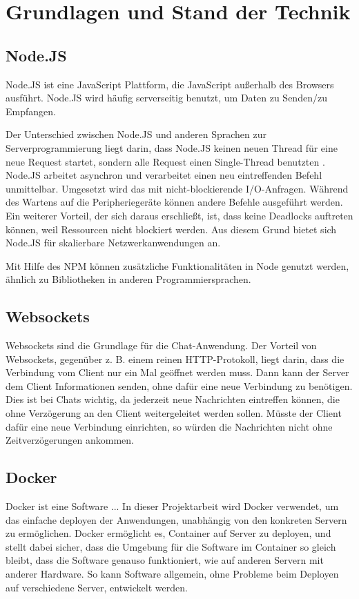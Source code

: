 
\chapter{Grundlagen und Stand der Technik}\label{cha:Grundlagen}
\section{Node.JS}\label{sec:Node.JS}
Node.JS ist eine JavaScript Plattform, die JavaScript außerhalb des Browsers ausführt. Node.JS wird häufig serverseitig benutzt, um Daten zu Senden/zu Empfangen. \cite[vgl.]{Node.2019}

Der Unterschied zwischen Node.JS und anderen Sprachen zur Serverprogrammierung liegt darin, dass Node.JS keinen neuen Thread für eine neue Request startet, sondern alle Request einen Single-Thread benutzten \cite[vgl.][3]{Holmes.2013}. Node.JS arbeitet asynchron und verarbeitet einen neu eintreffenden Befehl unmittelbar. Umgesetzt wird das mit nicht-blockierende I/O-Anfragen. Während des Wartens auf die Peripheriegeräte können andere Befehle ausgeführt werden. Ein weiterer Vorteil, der sich daraus erschließt, ist, dass keine Deadlocks auftreten können, weil Ressourcen nicht blockiert werden. Aus diesem Grund bietet sich Node.JS für skalierbare Netzwerkanwendungen an. \cite[vgl.][4]{Holmes.2013}

Mit Hilfe des \acf{NPM} können zusätzliche Funktionalitäten in Node genutzt werden, ähnlich zu Bibliotheken in anderen Programmiersprachen.

\section{Websockets}\label{sec:Websockets}
Websockets sind die Grundlage für die Chat-Anwendung. Der Vorteil von Websockets, gegenüber z. B. einem reinen \ac{HTTP}-Protokoll, liegt darin, dass die Verbindung vom Client nur ein Mal geöffnet werden muss. Dann kann der Server dem Client Informationen senden, ohne dafür eine neue Verbindung zu benötigen. Dies ist bei Chats wichtig, da jederzeit neue Nachrichten eintreffen können, die ohne Verzögerung an den Client weitergeleitet werden sollen. Müsste der Client dafür eine neue Verbindung einrichten, so würden die Nachrichten nicht ohne Zeitverzögerungen ankommen.
\section{Docker}\label{sec:Docker}
Docker ist eine Software ... In dieser Projektarbeit wird Docker verwendet, um das einfache deployen der Anwendungen, unabhängig von den konkreten Servern zu ermöglichen. Docker ermöglicht es, Container auf Server zu deployen, und stellt dabei sicher, dass die Umgebung für die Software im Container so gleich bleibt, dass die Software genauso funktioniert, wie auf anderen Servern mit anderer Hardware. So kann Software allgemein, ohne Probleme beim Deployen auf verschiedene Server, entwickelt werden.
